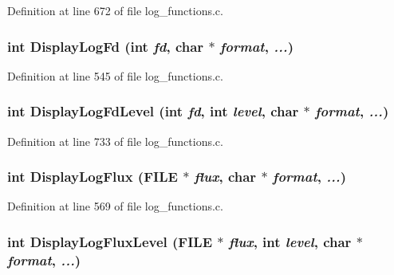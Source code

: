 Definition at line 672 of file log\_\-functions.c.
\subsubsection[{DisplayLogFd}]{\setlength{\rightskip}{0pt plus 5cm}int DisplayLogFd (int {\em fd}, \/  char $\ast$ {\em format}, \/   {\em ...})}\label{log__functions_8c_8cf8a91fec9537c6781388b2c486a56b}




Definition at line 545 of file log\_\-functions.c.
\subsubsection[{DisplayLogFdLevel}]{\setlength{\rightskip}{0pt plus 5cm}int DisplayLogFdLevel (int {\em fd}, \/  int {\em level}, \/  char $\ast$ {\em format}, \/   {\em ...})}\label{log__functions_8c_da0ae0a4b8a66f33b3ae9017ac02a807}




Definition at line 733 of file log\_\-functions.c.
\subsubsection[{DisplayLogFlux}]{\setlength{\rightskip}{0pt plus 5cm}int DisplayLogFlux (FILE $\ast$ {\em flux}, \/  char $\ast$ {\em format}, \/   {\em ...})}\label{log__functions_8c_17cb2c845d02c26129b4a14a3cc0e33f}




Definition at line 569 of file log\_\-functions.c.
\subsubsection[{DisplayLogFluxLevel}]{\setlength{\rightskip}{0pt plus 5cm}int DisplayLogFluxLevel (FILE $\ast$ {\em flux}, \/  int {\em level}, \/  char $\ast$ {\em format}, \/   {\em ...})}\label{log__functions_8c_5a1e8ab73a755143e7dcea61cbea37fd}




